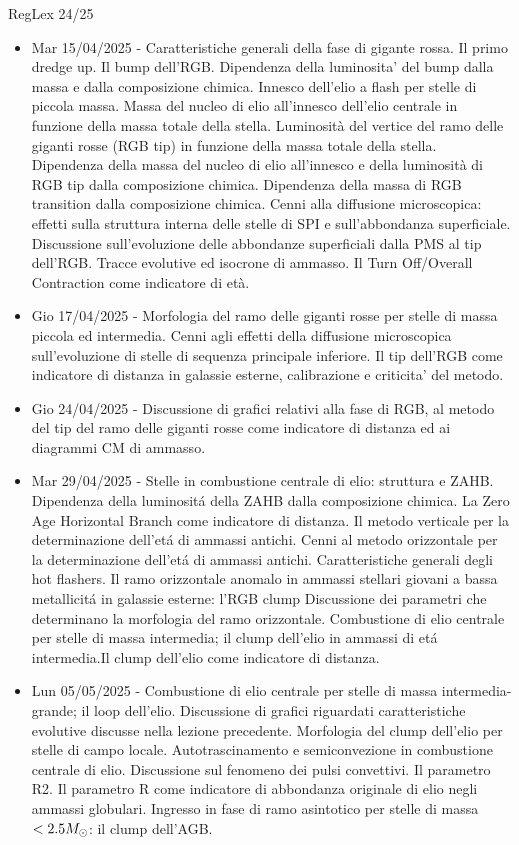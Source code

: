 \begin{frame}{RegLex 24/25}
\begin{itemize}
\item Mar 15/04/2025 - Caratteristiche generali della fase di gigante rossa. Il primo dredge up. Il bump dell'RGB. Dipendenza della luminosita' del bump dalla massa e dalla composizione chimica. Innesco dell'elio a flash per stelle di piccola massa. Massa del nucleo di elio all'innesco dell'elio centrale in funzione della massa totale della stella. Luminosità del vertice del ramo delle giganti rosse (RGB tip) in funzione della massa totale della stella. Dipendenza della massa del nucleo di elio all'innesco e della luminosità di RGB tip dalla composizione chimica. Dipendenza della massa di RGB transition dalla composizione chimica. Cenni alla diffusione microscopica: effetti sulla struttura interna delle stelle di SPI e sull'abbondanza superficiale. Discussione sull'evoluzione delle abbondanze superficiali dalla PMS al tip dell'RGB. Tracce evolutive ed isocrone di ammasso. Il Turn Off/Overall Contraction come indicatore di età.
\item Gio 17/04/2025 - Morfologia del ramo delle giganti rosse per stelle di massa piccola ed intermedia. Cenni agli effetti della diffusione microscopica sull'evoluzione di stelle di sequenza principale inferiore. Il tip dell'RGB come indicatore di distanza in galassie esterne, calibrazione e criticita' del metodo.
\item Gio 24/04/2025 - Discussione di grafici relativi alla fase di RGB, al metodo del tip del ramo delle giganti rosse come indicatore di distanza ed ai diagrammi CM di ammasso.
\item Mar 29/04/2025 - Stelle in combustione centrale di elio: struttura e ZAHB. Dipendenza della luminosit\'a della ZAHB dalla composizione chimica. La Zero Age Horizontal Branch come indicatore di distanza. Il metodo verticale per la determinazione dell'et\'a di ammassi antichi. Cenni al metodo orizzontale per la determinazione dell'et\'a di ammassi antichi. Caratteristiche generali degli hot flashers. Il ramo orizzontale anomalo in ammassi stellari giovani a bassa metallicit\'a in galassie esterne: l'RGB clump Discussione dei parametri che determinano la morfologia del ramo orizzontale. Combustione di elio centrale per stelle di massa intermedia; il clump dell'elio in ammassi di et\'a intermedia.Il clump dell'elio come indicatore di distanza.
\item Lun 05/05/2025 - Combustione di elio centrale per stelle di massa intermedia-grande; il loop dell'elio. Discussione di grafici riguardati caratteristiche evolutive discusse nella lezione precedente. Morfologia del clump dell'elio per stelle di campo locale. Autotrascinamento e semiconvezione in combustione centrale di elio. Discussione sul fenomeno dei pulsi convettivi. Il parametro R2. Il parametro R come indicatore di abbondanza originale di elio negli ammassi globulari. Ingresso in fase di ramo asintotico per stelle di massa $<2.5M_{\odot}{}$: il clump dell'AGB.

\end{itemize}
\end{frame}

